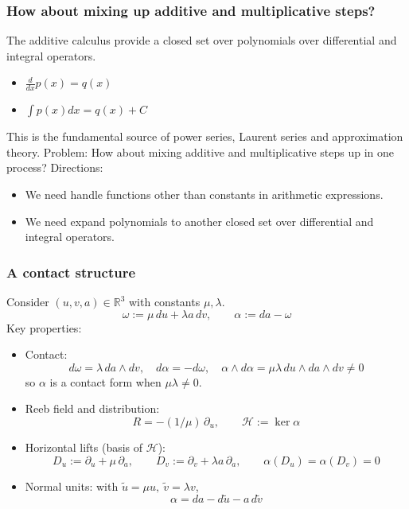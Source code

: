 \documentclass[aspectratio=169]{beamer}
\begin{document}
\begin{frame}
    \frametitle{How about mixing up additive and multiplicative steps?}
    The additive calculus provide a closed set over polynomials over differential and integral operators.
    \begin{itemize}
        \item $\frac{d}{dx} p(x) = q(x)$
        \item $\int p(x) dx = q(x) + C$
    \end{itemize}
    This is the fundamental source of power series, Laurent series and approximation theory.
    \newline\newline
    Problem: How about mixing additive and multiplicative steps up in one process?
    \newline\newline
    Directions:
    \begin{itemize}
        \item We need handle functions other than constants in arithmetic expressions.
        \item We need expand polynomials to another closed set over differential and integral operators.
    \end{itemize}
\end{frame}

\begin{frame}
    \frametitle{A contact structure}
    Consider $(u,v,a)\in\mathbb{R}^3$ with constants $\mu,\lambda$.
    \[
      \omega := \mu\,du + \lambda a\,dv,\qquad \alpha := da - \omega
    \]
    Key properties:
    \begin{itemize}
      \item Contact:
      \[
        d\omega=\lambda\,da\wedge dv,\quad d\alpha=-d\omega,\quad
        \alpha\wedge d\alpha=\mu\lambda\,du\wedge da\wedge dv\neq 0
      \]
      so $\alpha$ is a contact form when $\mu\lambda\neq 0$.
      \item Reeb field and distribution:
      \[
        R=-(1/\mu)\,\partial_u,\qquad \mathcal{H}:=\ker\alpha
      \]
      \item Horizontal lifts (basis of $\mathcal{H}$):
      \[
        D_u:=\partial_u+\mu\,\partial_a,\qquad
        D_v:=\partial_v+\lambda a\,\partial_a,\qquad \alpha(D_u)=\alpha(D_v)=0
      \]
      \item Normal units: with $\tilde u=\mu u,\ \tilde v=\lambda v$,
      \[
        \alpha=da-d\tilde u-a\,d\tilde v
      \]
    \end{itemize}
\end{frame}
\end{document}
